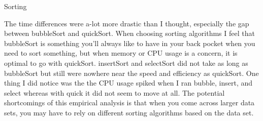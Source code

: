 Sorting

The time differences were a-lot more drastic than I thought, especially the gap between bubbleSort and quickSort. When choosing sorting algorithms I feel that bubbleSort is something you'll always like to have in your back pocket when you need to sort something, but when memory or CPU usage is a concern, it is optimal to go with quickSort. insertSort and selectSort did not take as long as bubbleSort but still were nowhere near the speed and efficiency as quickSort. One thing I did notice was the the CPU usage spiked when I ran bubble, insert, and select whereas with quick it did not seem to move at all. The potential shortcomings of this empirical analysis is that when you come across larger data sets, you may have to rely on different sorting algorithms based on the data set.  